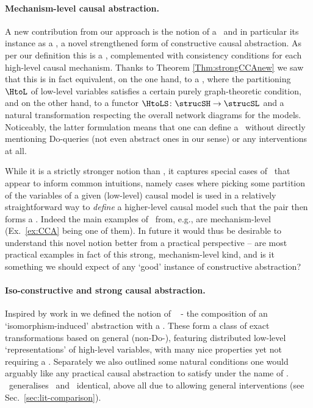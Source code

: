 \documentclass{article}
\begin{document}
\paragraph{Mechanism-level causal abstraction.} 
A new contribution from our approach is the notion of a \strucdownfull\ and in particular its instance as a \emph{\strongCCA}, a novel strengthened form of constructive causal abstraction. 
As per our definition this is a \CCA, complemented with consistency conditions for each high-level causal mechanism. 
Thanks to Theorem \ref{Thm:strongCCAnew} we saw that this is in fact equivalent, on the one hand, to a \CCA, where the partitioning $\HtoL$ of low-level variables satisfies a certain purely graph-theoretic condition, and on the other hand, to a functor $\HtoLS \colon \strucSH \to \strucSL$ and a natural transformation respecting the overall network diagrams for the models. 
Noticeably, the latter formulation means that one can define a \strongCCA\ without directly mentioning Do-queries (not even abstract ones in our sense) or any interventions at all. 

While it is a strictly stronger notion than \CCA, it captures special cases of \CCA\ that appear to inform common intuitions, namely cases where picking some partition of the variables of a given (low-level) causal model is used in a relatively straightforward way to \emph{define} a higher-level causal model such that the pair then forms a \CCA. 
Indeed the main examples of \CCA\ from, e.g., \cite{BeckersEtAl_2019_AbstractingCausalModles} are mechanism-level (Ex.~\ref{ex:CCA} being one of them). 
In future it would thus be desirable to understand this novel notion better from a practical perspective -- are most practical examples in fact of this strong, mechanism-level kind, and is it something we should expect of any `good' instance of constructive abstraction?  


\paragraph{Iso-constructive and strong causal abstraction.}

Inspired by work in \cite{geiger2024finding, geiger2023causal} we defined the notion of \ \emph{\isoCCA} - the composition of an `isomorphism-induced' abstraction with a \CCA. 
These form a class of exact transformations based on general (non-Do-), featuring distributed low-level `representations' of high-level variables, with many nice properties yet not requiring a \varalign. Separately we also outlined some natural conditions one would arguably like any practical causal abstraction to satisfy under the name of \emph{\strongCA}. \ generalises \CCA\ and \ identical, above all due to allowing general interventions (see Sec.~\ref{sec:lit-comparison}). 
\end{document}
